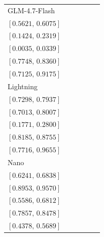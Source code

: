 \begin{tabular*}{\linewidth}{@{\extracolsep{\fill}}lccccc@{}}
GLM-4.7-Flash & \begin{tabular}[t]{@{}c@{}}\(0.5845\)\\\([0.5621,\,0.6075]\)\end{tabular} & \begin{tabular}[t]{@{}c@{}}\(0.1862\)\\\([0.1424,\,0.2319]\)\end{tabular} & \begin{tabular}[t]{@{}c@{}}\(0.0172\)\\\([0.0035,\,0.0339]\)\end{tabular} & \begin{tabular}[t]{@{}c@{}}\(0.8058\)\\\([0.7748,\,0.8360]\)\end{tabular} & \begin{tabular}[t]{@{}c@{}}\(0.8147\)\\\([0.7125,\,0.9175]\)\end{tabular}\\[2pt]
Lightning & \begin{tabular}[t]{@{}c@{}}\(0.7621\)\\\([0.7298,\,0.7937]\)\end{tabular} & \begin{tabular}[t]{@{}c@{}}\(0.7517\)\\\([0.7013,\,0.8007]\)\end{tabular} & \begin{tabular}[t]{@{}c@{}}\(0.2276\)\\\([0.1771,\,0.2800]\)\end{tabular} & \begin{tabular}[t]{@{}c@{}}\(0.8475\)\\\([0.8185,\,0.8755]\)\end{tabular} & \begin{tabular}[t]{@{}c@{}}\(0.8680\)\\\([0.7716,\,0.9655]\)\end{tabular}\\[2pt]
Nano & \begin{tabular}[t]{@{}c@{}}\(0.6534\)\\\([0.6241,\,0.6838]\)\end{tabular} & \begin{tabular}[t]{@{}c@{}}\(0.9276\)\\\([0.8953,\,0.9570]\)\end{tabular} & \begin{tabular}[t]{@{}c@{}}\(0.6207\)\\\([0.5586,\,0.6812]\)\end{tabular} & \begin{tabular}[t]{@{}c@{}}\(0.8171\)\\\([0.7857,\,0.8478]\)\end{tabular} & \begin{tabular}[t]{@{}c@{}}\(0.5024\)\\\([0.4378,\,0.5689]\)\end{tabular}\\[2pt]

\end{tabular*}
